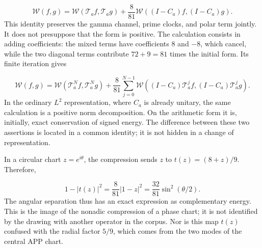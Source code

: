 \begin{equation}
\boxed{\mathscr W(f,g)=\mathscr W(\mathcal T_af,\mathcal T_ag)
+\frac8{81}\mathscr W((I-C_a)f,(I-C_a)g).}
\label{viii:tm-add-balance-aritmetico}
\end{equation}
This identity preserves the gamma channel, prime clocks, and polar term jointly. It does not presuppose that the form is positive. The calculation consists in adding coefficients: the mixed terms have coefficients \(8\) and \(-8\), which cancel, while the two diagonal terms contribute \(72+9=81\) times the initial form. Its finite iteration gives

\begin{equation}
\mathscr W(f,g)=\mathscr W(\mathcal T_a^Nf,\mathcal T_a^Ng)
+\frac8{81}\sum_{j=0}^{N-1}
\mathscr W((I-C_a)\mathcal T_a^jf,(I-C_a)\mathcal T_a^jg).
\label{viii:tm-add-balance-iterado}
\end{equation}
In the ordinary \(L^2\) representation, where \(C_a\) is already unitary, the same calculation is a positive norm decomposition. On the arithmetic form it is, initially, exact conservation of signed energy. The difference between these two assertions is located in a common identity; it is not hidden in a change of representation.

In a circular chart \(z=e^{i\theta}\), the compression sends \(z\) to \(t(z)=(8+z)/9\). Therefore,

\[
1-|t(z)|^2=\frac8{81}|1-z|^2
=\frac{32}{81}\sin^2(\theta/2).
\]
The angular separation thus has an exact expression as complementary energy. This is the image of the nonadic compression of a phase chart; it is not identified by the drawing with another operator in the corpus. Nor is this map \(t(z)\) confused with the radial factor \(5/9\), which comes from the two modes of the central APP chart.


